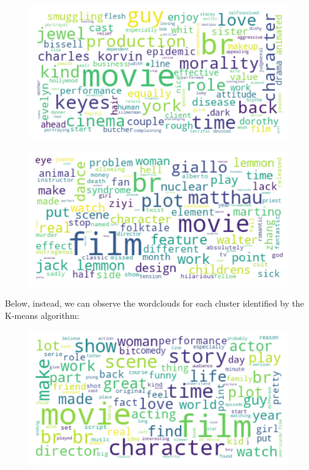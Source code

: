 \documentclass[fleqn,10pt]{SelfArx} %
\begin{document}
\begin{figure}[H]
\begin{center}
  \includegraphics[scale=0.5]{./images/dbscan_wordcloud4.png}
\end{center}
\end{figure}

\begin{figure}[H]
\begin{center}
  \includegraphics[scale=0.5]{./images/dbscan_wordcloud5.png}
\end{center}
\end{figure}

Below, instead, we can observe the wordclouds for each cluster identified by the K-means algorithm:

\begin{figure}[H]
\begin{center}
  \includegraphics[scale=0.5]{./images/kmeans_wordcloud1.png}
\end{center}
\end{figure}
\end{document}
